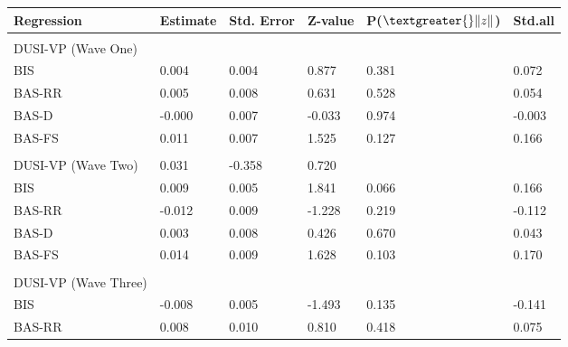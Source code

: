 \documentclass[utf8]{article}
\begin{document}
\begin{table}[]
\begin{tabular}{llllll}
Regression                     & Estimate & Std. Error & Z-value & P($\textgreater{}\|z\|$) & Std.all \\ \hline
                               &          &            &         &                          &         \\
DUSI-VP (Wave One)             &          &            &         &                          &         \\
BIS                            & 0.004    & 0.004      & 0.877   & 0.381                    & 0.072   \\
BAS-RR                         & 0.005    & 0.008      & 0.631   & 0.528                    & 0.054   \\
BAS-D                          & -0.000   & 0.007      & -0.033  & 0.974                    & -0.003  \\
BAS-FS                         & 0.011    & 0.007      & 1.525   & 0.127                    & 0.166   \\
                               &          &            &         &                          &         \\
DUSI-VP (Wave Two)             & 0.031    & -0.358     & 0.720   &                          &         \\
BIS                            & 0.009    & 0.005      & 1.841   & 0.066                    & 0.166   \\
BAS-RR                         & -0.012   & 0.009      & -1.228  & 0.219                    & -0.112  \\
BAS-D                          & 0.003    & 0.008      & 0.426   & 0.670                    & 0.043   \\
BAS-FS                         & 0.014    & 0.009      & 1.628   & 0.103                    & 0.170   \\
                               &          &            &         &                          &         \\
DUSI-VP (Wave Three)           &          &            &         &                          &         \\
BIS                            & -0.008   & 0.005      & -1.493  & 0.135                    & -0.141  \\
BAS-RR                         & 0.008    & 0.010      & 0.810   & 0.418                    & 0.075   \\

\end{tabular}
\end{table}
\end{document}
